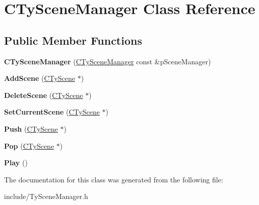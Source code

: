 \hypertarget{class_c_ty_scene_manager}{
\section{CTySceneManager Class Reference}
\label{class_c_ty_scene_manager}
}
\subsection*{Public Member Functions}
\begin{DoxyCompactItemize}
\item 
\hypertarget{class_c_ty_scene_manager_aff1fdcdb85ee67ad8a2fe620414ee680}{
{\bfseries CTySceneManager} (\hyperlink{class_c_ty_scene_manager}{CTySceneManager} const \&pSceneManager)}
\label{class_c_ty_scene_manager_aff1fdcdb85ee67ad8a2fe620414ee680}

\item 
\hypertarget{class_c_ty_scene_manager_a8fb45de8768bb2ba9f9d4487e20b9362}{
{\bfseries AddScene} (\hyperlink{class_c_ty_scene}{CTyScene} $\ast$)}
\label{class_c_ty_scene_manager_a8fb45de8768bb2ba9f9d4487e20b9362}

\item 
\hypertarget{class_c_ty_scene_manager_a32fef21b8dc7e14544c76e5a24c1b1c4}{
{\bfseries DeleteScene} (\hyperlink{class_c_ty_scene}{CTyScene} $\ast$)}
\label{class_c_ty_scene_manager_a32fef21b8dc7e14544c76e5a24c1b1c4}

\item 
\hypertarget{class_c_ty_scene_manager_a7ad0e06bc2d93703f4ce7a015f9a96d5}{
{\bfseries SetCurrentScene} (\hyperlink{class_c_ty_scene}{CTyScene} $\ast$)}
\label{class_c_ty_scene_manager_a7ad0e06bc2d93703f4ce7a015f9a96d5}

\item 
\hypertarget{class_c_ty_scene_manager_a4a567901bbf0869275cc78faf3ceb4ab}{
{\bfseries Push} (\hyperlink{class_c_ty_scene}{CTyScene} $\ast$)}
\label{class_c_ty_scene_manager_a4a567901bbf0869275cc78faf3ceb4ab}

\item 
\hypertarget{class_c_ty_scene_manager_ad79d3fd3aeff76bcc3ef62c82e5bd0c9}{
{\bfseries Pop} (\hyperlink{class_c_ty_scene}{CTyScene} $\ast$)}
\label{class_c_ty_scene_manager_ad79d3fd3aeff76bcc3ef62c82e5bd0c9}

\item 
\hypertarget{class_c_ty_scene_manager_ac91d52d9fa985296ec97142c3c7fe416}{
{\bfseries Play} ()}
\label{class_c_ty_scene_manager_ac91d52d9fa985296ec97142c3c7fe416}

\end{DoxyCompactItemize}


The documentation for this class was generated from the following file:\begin{DoxyCompactItemize}
\item 
include/TySceneManager.h\end{DoxyCompactItemize}
